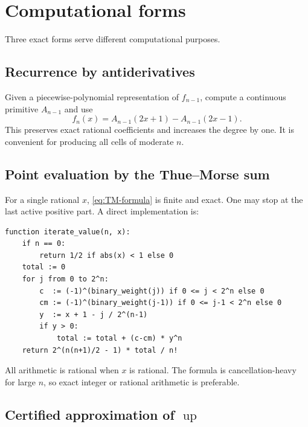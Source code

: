 \documentclass[11pt,oneside]{article}
\theoremstyle{definition}
\theoremstyle{remark}
\newcommand{\Up}{\operatorname{up}}
\begin{document}
\section{Computational forms}
\label{sec:computation}

Three exact forms serve different computational purposes.

\subsection{Recurrence by antiderivatives}

Given a piecewise-polynomial representation of $f_{n-1}$, compute a continuous primitive
$A_{n-1}$ and use
\begin{equation}
 f_n(x)=A_{n-1}(2x+1)-A_{n-1}(2x-1).                       \label{eq:primitive-algorithm}
\end{equation}
This preserves exact rational coefficients and increases the degree by one.  It is convenient
for producing all cells of moderate $n$.

\subsection{Point evaluation by the Thue--Morse sum}

For a single rational $x$, \eqref{eq:TM-formula} is finite and exact.  One may stop at the last
active positive part.  A direct implementation is:

\begin{lstlisting}[style=pseudo,caption={Exact evaluation of the $n$th repeated-integration stage}]
function iterate_value(n, x):
    if n == 0:
        return 1/2 if abs(x) < 1 else 0
    total := 0
    for j from 0 to 2^n:
        c  := (-1)^(binary_weight(j)) if 0 <= j < 2^n else 0
        cm := (-1)^(binary_weight(j-1)) if 0 <= j-1 < 2^n else 0
        y  := x + 1 - j / 2^(n-1)
        if y > 0:
            total := total + (c-cm) * y^n
    return 2^(n(n+1)/2 - 1) * total / n!
\end{lstlisting}

All arithmetic is rational when $x$ is rational.  The formula is cancellation-heavy for large
$n$, so exact integer or rational arithmetic is preferable.

\subsection{Certified approximation of \texorpdfstring{$\Up$}{up}}
\end{document}
